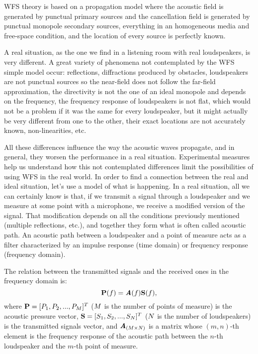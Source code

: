 WFS theory is based on a propagation model where the acoustic field is generated by punctual primary sources and the cancellation field is generated by punctual monopole secondary sources, everything in an homogeneous media and free-space condition, and the location of every source is perfectly known.

A real situation, as the one we find in a listening room with real loudspeakers, is very different. A great variety of phenomena not contemplated by the WFS simple model occur: reflections, diffractions produced by obstacles, loudspeakers are not punctual sources so the near-field does not follow the far-field approximation, the directivity is not the one of an ideal monopole and depends on the frequency, the frequency response of loudspeakers is not flat, which would not be a problem if it was the same for every loudspeaker, but it might actually be very different from one to the other, their exact locations are not accurately known, non-linearities, etc.

All these differences influence the way the acoustic waves propagate, and in general, they worsen the performance in a real situation. Experimental measures help us understand how this not contemplated differences limit the possibilities of using WFS in the real world. In order to find a connection between the real and ideal situation, let's use a model of what is happening. In a real situation, all we can certainly know is that, if we transmit a signal through a loudspeaker and we measure at some point with a microphone, we receive a modified version of the signal. That modification depends on all the conditions previously mentioned (multiple reflections, etc.), and together they form what is often called acoustic path. An acoustic path between a loudspeaker and a point of measure acts as a filter characterized by an impulse response (time domain) or frequency response (frequency domain).

The relation between the transmitted signals and the received ones in the frequency domain is:
\begin{equation}
\Field[noValue][frequency][vector](f) = \AcPath[mat](f) \vec{\signal[nothing][frequency]}(f) ,
\end{equation}
where $\Field[noValue][frequency][vector] = [\Field[noValue][frequency][scalar]_1, \Field[noValue][frequency][scalar]_2, ..., \Field[noValue][frequency][scalar]_\numMeasPoints]^T$ ($M$ is the number of points of measure) is the acoustic pressure vector, $\vec{\signal[nothing][frequency]} = [\signal[nothing][frequency]_1, \signal[nothing][frequency]_2, ..., \signal[nothing][frequency]_\numSources]^T$ ($N$ is the number of loudspeakers) is the transmitted signals vector, and $\AcPath[mat]_{(\numMeasPoints \times \numSources)}$ is a matrix whose $(m,n)$-th element is the frequency response of the acoustic path between the $n$-th loudspeaker and the $m$-th point of measure.

